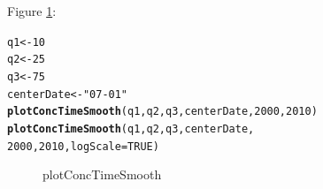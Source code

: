 \documentclass[a4paper,11pt]{article}\usepackage[]{graphicx}\usepackage[]{color}
\makeatletter
\newcommand{\hlnum}[1]{\textcolor[rgb]{0.686,0.059,0.569}{#1}}%
\newcommand{\hlstr}[1]{\textcolor[rgb]{0.192,0.494,0.8}{#1}}%
\newcommand{\hlstd}[1]{\textcolor[rgb]{0.345,0.345,0.345}{#1}}%
\newcommand{\hlkwb}[1]{\textcolor[rgb]{0.69,0.353,0.396}{#1}}%
\newcommand{\hlkwc}[1]{\textcolor[rgb]{0.333,0.667,0.333}{#1}}%
\newcommand{\hlkwd}[1]{\textcolor[rgb]{0.737,0.353,0.396}{\textbf{#1}}}%
\newenvironment{kframe}{%
 \def\at@end@of@kframe{}%
 \ifinner\ifhmode%
  \def\at@end@of@kframe{\end{minipage}}%
  \begin{minipage}{\columnwidth}%
 \fi\fi%
 \def\FrameCommand##1{\hskip\@totalleftmargin \hskip-\fboxsep
 \colorbox{shadecolor}{##1}\hskip-\fboxsep
     \hskip-\linewidth \hskip-\@totalleftmargin \hskip\columnwidth}%
 \MakeFramed {\advance\hsize-\width
   \@totalleftmargin\z@ \linewidth\hsize
   \@setminipage}}%
 {\par\unskip\endMakeFramed%
 \at@end@of@kframe}
\newenvironment{knitrout}{}{} %
\makeatother
\begin{document}
Figure \ref{fig:plotConcTimeSmooth}:
\begin{knitrout}
\color{fgcolor}\begin{kframe}
\begin{alltt}
\hlstd{q1} \hlkwb{<-} \hlnum{10}
\hlstd{q2} \hlkwb{<-} \hlnum{25}
\hlstd{q3} \hlkwb{<-} \hlnum{75}
\hlstd{centerDate} \hlkwb{<-} \hlstr{"07-01"}
\hlkwd{plotConcTimeSmooth}\hlstd{(q1, q2, q3, centerDate,} \hlnum{2000}\hlstd{,} \hlnum{2010}\hlstd{)}
\hlkwd{plotConcTimeSmooth}\hlstd{(q1, q2, q3, centerDate,}
                   \hlnum{2000}\hlstd{,} \hlnum{2010}\hlstd{,}\hlkwc{logScale}\hlstd{=}\hlnum{TRUE}\hlstd{)}
\end{alltt}
\end{kframe}\begin{figure}[]
\caption[plotConcTimeSmooth]{plotConcTimeSmooth\label{fig:plotConcTimeSmooth}}
\end{figure}


\end{knitrout}
\end{document}
